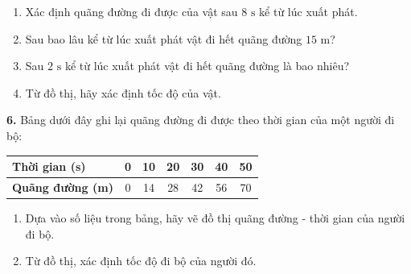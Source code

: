 \documentclass[13pt,a4paper]{article}
\begin{document}
\begin{enumerate}[label=\alph*.,leftmargin=1.5cm,itemsep=1pt]
  \item Xác định quãng đường đi được của vật sau $8\text{ s}$ kể từ lúc xuất phát.
  \item Sau bao lâu kể từ lúc xuất phát vật đi hết quãng đường $15\text{ m}$?
  \item Sau $2\text{ s}$ kể từ lúc xuất phát vật đi hết quãng đường là bao nhiêu?
  \item Từ đồ thị, hãy xác định tốc độ của vật.
\end{enumerate}
\par\vspace{1pt}\noindent\dotfill\par\vspace{4pt}\noindent\dotfill\par\vspace{4pt}\noindent\dotfill\par\vspace{4pt}\noindent\dotfill\par\vspace{4pt}\noindent\dotfill\par\vspace{4pt}\noindent\dotfill\par\vspace{4pt}\noindent\dotfill\par\vspace{4pt}\noindent
\textbf{6.} Bảng dưới đây ghi lại quãng đường đi được theo thời gian của một người đi bộ:

\begin{center}
\begin{tabular}{|l|c|c|c|c|c|c|}
\hline
\textbf{Thời gian (s)} & 0 & 10 & 20 & 30 & 40 & 50 \\ \hline
\textbf{Quãng đường (m)} & 0 & 14 & 28 & 42 & 56 & 70 \\ \hline
\end{tabular}
\end{center}

\begin{enumerate}[label=\alph*.,leftmargin=1.5cm,itemsep=1pt]
  \item Dựa vào số liệu trong bảng, hãy vẽ đồ thị quãng đường - thời gian của người đi bộ.
  \item Từ đồ thị, xác định tốc độ đi bộ của người đó.
\end{enumerate}
\end{document}
